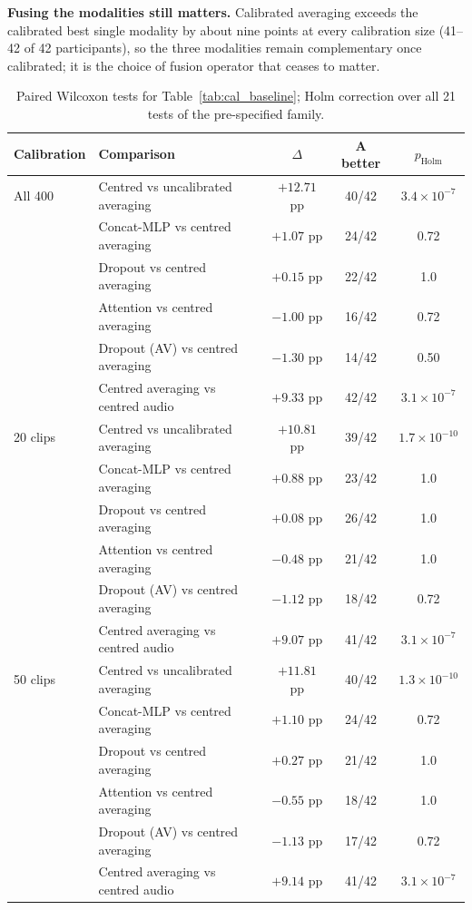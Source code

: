 \textbf{Fusing the modalities still matters.} Calibrated averaging exceeds the
calibrated best single modality by about nine points at every calibration size (41--42
of 42 participants), so the three modalities remain complementary once calibrated; it
is the choice of fusion operator that ceases to matter.

\begin{table}[htbp]
\centering
\small
\caption{Paired Wilcoxon tests for Table~\ref{tab:cal_baseline}; Holm correction over
all 21 tests of the pre-specified family.}
\label{tab:cal_baseline_tests}
\begin{tabular}{llccc}
\hline
\textbf{Calibration} & \textbf{Comparison} & \textbf{$\Delta$} & \textbf{A better} & \textbf{$p_{\mathrm{Holm}}$} \\
\hline
All 400 & Centred vs uncalibrated averaging & $+12.71$ pp & 40/42 & $3.4\times10^{-7}$ \\
        & Concat-MLP vs centred averaging    & $+1.07$ pp  & 24/42 & 0.72 \\
        & Dropout vs centred averaging       & $+0.15$ pp  & 22/42 & 1.0 \\
        & Attention vs centred averaging     & $-1.00$ pp  & 16/42 & 0.72 \\
        & Dropout (AV) vs centred averaging  & $-1.30$ pp  & 14/42 & 0.50 \\
        & Centred averaging vs centred audio & $+9.33$ pp  & 42/42 & $3.1\times10^{-7}$ \\
\hline
20 clips & Centred vs uncalibrated averaging & $+10.81$ pp & 39/42 & $1.7\times10^{-10}$ \\
         & Concat-MLP vs centred averaging    & $+0.88$ pp  & 23/42 & 1.0 \\
         & Dropout vs centred averaging       & $+0.08$ pp  & 26/42 & 1.0 \\
         & Attention vs centred averaging     & $-0.48$ pp  & 21/42 & 1.0 \\
         & Dropout (AV) vs centred averaging  & $-1.12$ pp  & 18/42 & 0.72 \\
         & Centred averaging vs centred audio & $+9.07$ pp  & 41/42 & $3.1\times10^{-7}$ \\
\hline
50 clips & Centred vs uncalibrated averaging & $+11.81$ pp & 40/42 & $1.3\times10^{-10}$ \\
         & Concat-MLP vs centred averaging    & $+1.10$ pp  & 24/42 & 0.72 \\
         & Dropout vs centred averaging       & $+0.27$ pp  & 21/42 & 1.0 \\
         & Attention vs centred averaging     & $-0.55$ pp  & 18/42 & 1.0 \\
         & Dropout (AV) vs centred averaging  & $-1.13$ pp  & 17/42 & 0.72 \\
         & Centred averaging vs centred audio & $+9.14$ pp  & 41/42 & $3.1\times10^{-7}$ \\
\hline
\end{tabular}
\end{table}

